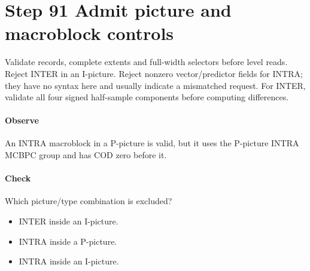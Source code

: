 \section{Step 91 Admit picture and macroblock controls}\label{h263-syntax-s01}
Validate records, complete extents and full-width selectors before level reads.
Reject INTER in an I-picture. Reject nonzero vector/predictor fields for INTRA;
they have no syntax here and usually indicate a mismatched request. For INTER,
validate all four signed half-sample components before computing differences.

\paragraph{Observe} An INTRA macroblock in a P-picture is valid, but it uses the
P-picture INTRA MCBPC group and has COD zero before it.
\paragraph{Check} Which picture/type combination is excluded?
\begin{itemize}
  \item[A.] INTER inside an I-picture.
  \item[B.] INTRA inside a P-picture.
  \item[C.] INTRA inside an I-picture.
\end{itemize}
